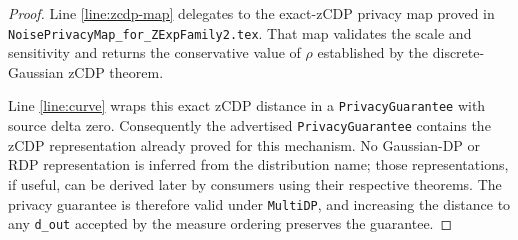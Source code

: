 \documentclass{article}
\begin{document}
\begin{proof}
Line \ref{line:zcdp-map} delegates to the exact-zCDP privacy map proved in
\texttt{NoisePrivacyMap\_for\_ZExpFamily2.tex}. That map validates the scale and
sensitivity and returns the conservative value of $\rho$ established by the
discrete-Gaussian zCDP theorem.

Line \ref{line:curve} wraps this exact zCDP distance in a
\texttt{PrivacyGuarantee} with source delta zero. Consequently the advertised
\texttt{PrivacyGuarantee} contains the zCDP representation already
proved for this mechanism. No Gaussian-DP or RDP representation is inferred
from the distribution name; those representations, if useful, can be derived
later by consumers using their respective theorems. The privacy guarantee is
therefore valid under \texttt{MultiDP}, and increasing the distance to any
\texttt{d\_out} accepted by the measure ordering preserves the guarantee.
\end{proof}



\end{document}
